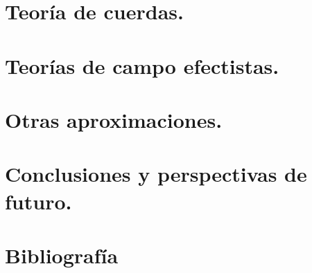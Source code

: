 \documentclass[11pt,a4paper,titlepage]{article}
\begin{document}
%
%
%
%
\section{Teoría de cuerdas.}

%
%
%
%
\section{Teorías de campo efectistas.} %

%
%
%
%
\section{Otras aproximaciones.} %

%
%
%
%
\section{Conclusiones y perspectivas de futuro.} %

%
%
%
%
\section{Bibliografía}


\nocite{*}
\end{document}
